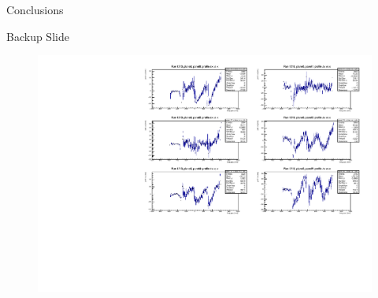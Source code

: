 \documentclass{beamer}[10pt]
\begin{document}
\begin{frame}{Conclusions}
 
\end{frame}
\begin{frame}{Backup Slide}
  
      \begin{figure}[H]
        \centering
        \includegraphics[width= \textwidth]{figures/pdf/plane0_prof_bias.pdf}
        \label{fig:enter-label}
    \end{figure}
  \end{frame}
\end{document}
